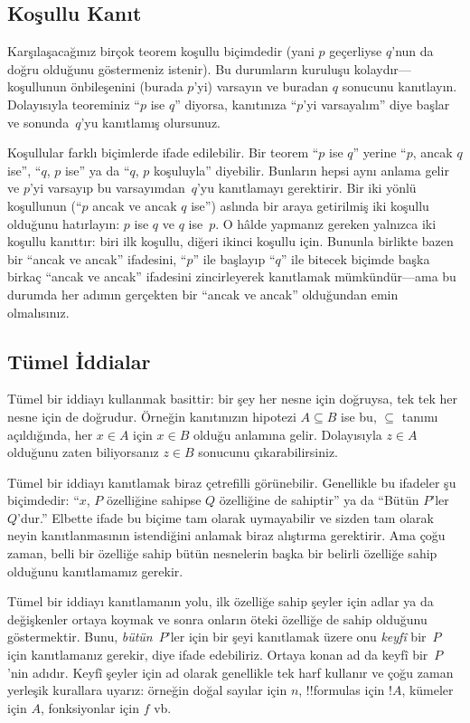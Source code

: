 \documentclass[../../../include/open-logic-section]{subfiles}
\begin{document}
\subsection{Koşullu Kanıt}

Karşılaşacağınız birçok teorem koşullu biçimdedir (yani $p$ geçerliyse
$q$'nun da doğru olduğunu göstermeniz istenir). Bu durumların kuruluşu
kolaydır---koşullunun önbileşenini (burada $p$'yi) varsayın ve buradan
$q$ sonucunu kanıtlayın. Dolayısıyla teoreminiz ``$p$ ise $q$'' diyorsa,
kanıtınıza ``$p$'yi varsayalım'' diye başlar ve sonunda~$q$'yu
kanıtlamış olursunuz.

Koşullular farklı biçimlerde ifade edilebilir. Bir teorem ``$p$ ise
$q$'' yerine ``$p$, ancak $q$ ise'', ``$q$, $p$ ise'' ya da ``$q$,
$p$ koşuluyla'' diyebilir. Bunların hepsi aynı anlama gelir ve $p$'yi
varsayıp bu varsayımdan~$q$'yu kanıtlamayı gerektirir. Bir iki yönlü
koşullunun (``$p$ ancak ve ancak $q$ ise'') aslında bir araya getirilmiş
iki koşullu olduğunu hatırlayın: $p$ ise $q$ ve $q$ ise~$p$. O hâlde
yapmanız gereken yalnızca iki koşullu kanıttır: biri ilk koşullu, diğeri
ikinci koşullu için. Bununla birlikte bazen bir ``ancak ve ancak''
ifadesini, ``$p$'' ile başlayıp ``$q$'' ile bitecek biçimde başka birkaç
``ancak ve ancak'' ifadesini zincirleyerek kanıtlamak mümkündür---ama bu
durumda her adımın gerçekten bir ``ancak ve ancak'' olduğundan emin
olmalısınız.

\subsection{Tümel İddialar}

Tümel bir iddiayı kullanmak basittir: bir şey her nesne için doğruysa,
tek tek her nesne için de doğrudur. Örneğin kanıtınızın hipotezi $A
\subseteq B$ ise bu, $\subseteq$ tanımı açıldığında, her $x \in A$ için
$x \in B$ olduğu anlamına gelir. Dolayısıyla $z \in A$ olduğunu zaten
biliyorsanız $z \in B$ sonucunu çıkarabilirsiniz.

Tümel bir iddiayı kanıtlamak biraz çetrefilli görünebilir. Genellikle
bu ifadeler şu biçimdedir: ``$x$, $P$ özelliğine sahipse $Q$ özelliğine
de sahiptir'' ya da ``Bütün $P$'ler $Q$'dur.'' Elbette ifade bu biçime
tam olarak uymayabilir ve sizden tam olarak neyin kanıtlanmasının
istendiğini anlamak biraz alıştırma gerektirir. Ama çoğu zaman, belli
bir özelliğe sahip bütün nesnelerin başka bir belirli özelliğe sahip
olduğunu kanıtlamamız gerekir.

Tümel bir iddiayı kanıtlamanın yolu, ilk özelliğe sahip şeyler için
adlar ya da değişkenler ortaya koymak ve sonra onların öteki özelliğe
de sahip olduğunu göstermektir. Bunu, \emph{bütün}~$P$'ler için bir şeyi
kanıtlamak üzere onu \emph{keyfî} bir~$P$ için kanıtlamanız gerekir,
diye ifade edebiliriz. Ortaya konan ad da keyfî bir~$P$'nin adıdır.
Keyfî şeyler için ad olarak genellikle tek harf kullanır ve çoğu zaman
yerleşik kurallara uyarız: örneğin doğal sayılar için $n$,
!!{formula}s için $!A$, kümeler için $A$, fonksiyonlar için $f$ vb.
\end{document}
